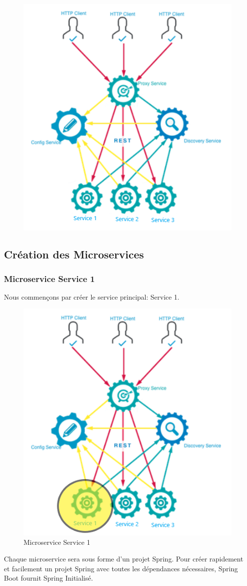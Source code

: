 \begin{figure}[H]
	\centering
	\includegraphics[width=0.5\linewidth]{images/tp01}
	\caption{}
	\label{fig:tp01}
\end{figure}


\subsection{Création des Microservices}
\subsubsection{Microservice  Service 1}
Nous commençons par créer le service principal: Service 1.

\begin{figure}[H]
	\centering
	\includegraphics[width=0.5\linewidth]{images/tp02}
	\caption{Microservice  Service 1}
	\label{fig:tp02}
\end{figure}


Chaque microservice sera sous forme d'un projet Spring. Pour créer rapidement et facilement un projet Spring avec toutes les dépendances nécessaires, Spring Boot fournit Spring Initialisé.

